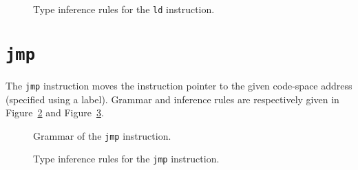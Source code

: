 \begin{figure}[H]
  \centering


  \caption{Type inference rules for the \texttt{ld} instruction.}
  \label{fig:nstar-instructionset-ld-typerules}
\end{figure}

\section{\texttt{jmp}}\label{sec:nstar-instructionset-jmp}

The \texttt{jmp} instruction moves the instruction pointer to the given code-space address (specified using a label).
Grammar and inference rules are respectively given in Figure~\ref{fig:nstar-instructionset-jmp-grammar} and Figure~\ref{fig:nstar-instructionset-jmp-typerules}.

\begin{figure}[H]
  \centering


  \caption{Grammar of the \texttt{jmp} instruction.}
  \label{fig:nstar-instructionset-jmp-grammar}
\end{figure}

\begin{figure}[H]
  \centering


  \caption{Type inference rules for the \texttt{jmp} instruction.}
  \label{fig:nstar-instructionset-jmp-typerules}
\end{figure}

